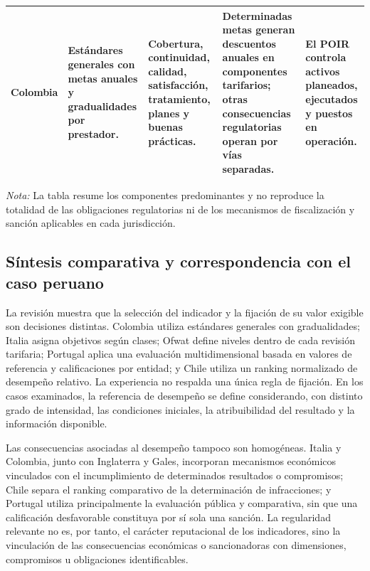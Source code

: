 \begin{table}[!t]
\begin{tabularx}{\textwidth}{
>{\raggedright\arraybackslash}p{1.68cm}
>{\raggedright\arraybackslash}p{2.47cm}
>{\raggedright\arraybackslash}X
>{\raggedright\arraybackslash}p{3.20cm}
>{\raggedright\arraybackslash}p{2.85cm}}
Colombia
&
Estándares generales con metas anuales y gradualidades por prestador.
&
Cobertura, continuidad, calidad, satisfacción, tratamiento, planes y buenas prácticas.
&
Determinadas metas generan descuentos anuales en componentes tarifarios; otras consecuencias regulatorias operan por vías separadas.
&
El POIR controla activos planeados, ejecutados y puestos en operación.
\\
\hline
\end{tabularx}

\begin{minipage}{\textwidth}
\footnotesize
\textit{Nota:} La tabla resume los componentes predominantes y no reproduce la totalidad de las obligaciones regulatorias ni de los mecanismos de fiscalización y sanción aplicables en cada jurisdicción.
\end{minipage}
\end{table}

\subsection{Síntesis comparativa y correspondencia con el caso peruano}
\label{anexo:tratamiento_indicadores_peru}
\label{anexo:sintesis_experiencia_internacional}

La revisión muestra que la selección del indicador y la fijación de su valor exigible son decisiones distintas. Colombia utiliza estándares generales con gradualidades; Italia asigna objetivos según clases; Ofwat define niveles dentro de cada revisión tarifaria; Portugal aplica una evaluación multidimensional basada en valores de referencia y calificaciones por entidad; y Chile utiliza un ranking normalizado de desempeño relativo. La experiencia no respalda una única regla de fijación. En los casos examinados, la referencia de desempeño se define considerando, con distinto grado de intensidad, las condiciones iniciales, la atribuibilidad del resultado y la información disponible.

Las consecuencias asociadas al desempeño tampoco son homogéneas. Italia y Colombia, junto con Inglaterra y Gales, incorporan mecanismos económicos vinculados con el incumplimiento de determinados resultados o compromisos; Chile separa el ranking comparativo de la determinación de infracciones; y Portugal utiliza principalmente la evaluación pública y comparativa, sin que una calificación desfavorable constituya por sí sola una sanción. La regularidad relevante no es, por tanto, el carácter reputacional de los indicadores, sino la vinculación de las consecuencias económicas o sancionadoras con dimensiones, compromisos u obligaciones identificables.


